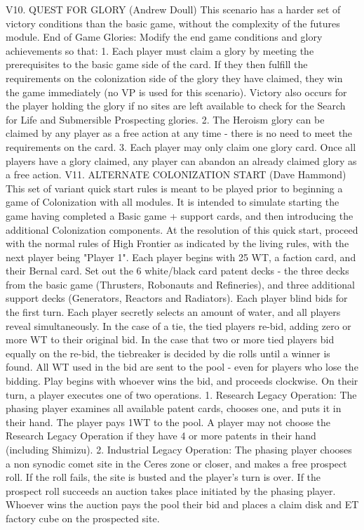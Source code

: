\documentclass[a4paper]{book}
\begin{document}
V10. QUEST FOR GLORY (Andrew Doull)
This scenario has a harder set of victory conditions than the basic game, without the  complexity of the futures module.
End of Game Glories: Modify the end game conditions and glory achievements so that:
1. Each player must claim a glory by meeting the prerequisites to the basic game side of the card. If they then fulfill the requirements on the colonization side of the glory they have claimed, they win the game immediately (no VP is used for this scenario). Victory also occurs for the player holding the glory if no sites are left available to check for the Search for Life and Submersible Prospecting glories.
2. The Heroism glory can be claimed by any player as a free action at any time - there is no need to meet the requirements on the card.
3. Each player may only claim one glory card. Once all players have a glory claimed, any player can abandon an already claimed glory as a free action.
V11. ALTERNATE COLONIZATION START (Dave Hammond)
This set of variant quick start rules is meant to be played prior to beginning a game of Colonization with all modules. It is intended to simulate starting the game having completed a Basic game + support cards, and then introducing the additional Colonization components. At the resolution of this quick start, proceed with the normal rules of High Frontier as indicated by the living rules, with the next player being "Player 1".
Each player begins with 25 WT, a faction card, and their Bernal card. Set out the 6 white/black card patent decks - the three decks from the basic game (Thrusters, Robonauts and Refineries), and three additional support decks (Generators, Reactors and Radiators). 
Each player blind bids for the first turn. Each player secretly selects an amount of water, and all players reveal simultaneously. In the case of a tie, the tied players re-bid, adding zero or more WT to their original bid. In the case that two or more tied players bid equally on the re-bid, the tiebreaker is decided by die rolls until a winner is found. All WT used in the bid are sent to the pool - even for players who lose the bidding. Play begins with whoever wins the bid, and proceeds clockwise.
On their turn, a player executes one of two operations.
1. Research Legacy Operation: The phasing player examines all available patent cards, chooses one, and puts it in their hand. The player pays 1WT to the pool. A player may not choose the Research Legacy Operation if they have 4 or more patents in their hand (including Shimizu).
2. Industrial Legacy Operation: The phasing player chooses a non synodic comet site in the Ceres zone or closer, and makes a free prospect roll. If the roll fails, the site is busted and the player's turn is over. If the prospect roll succeeds an auction takes place initiated by the phasing player. Whoever wins the auction pays the pool their bid and places a claim disk and ET factory cube on the prospected site.
\end{document}
